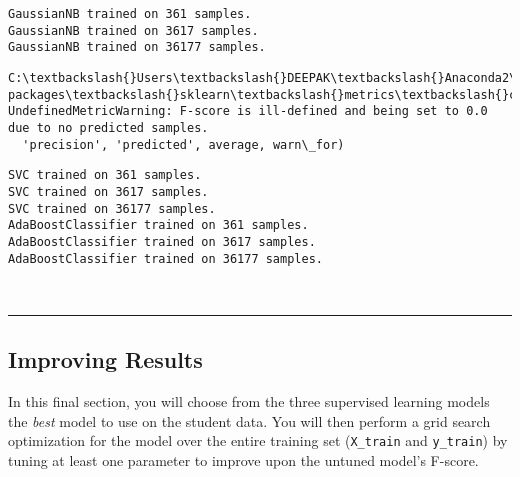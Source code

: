 \documentclass[11pt]{article}
\begin{document}
    \begin{Verbatim}[commandchars=\\\{\}]
GaussianNB trained on 361 samples.
GaussianNB trained on 3617 samples.
GaussianNB trained on 36177 samples.

    \end{Verbatim}

    \begin{Verbatim}[commandchars=\\\{\}]
C:\textbackslash{}Users\textbackslash{}DEEPAK\textbackslash{}Anaconda2\textbackslash{}lib\textbackslash{}site-packages\textbackslash{}sklearn\textbackslash{}metrics\textbackslash{}classification.py:1135: UndefinedMetricWarning: F-score is ill-defined and being set to 0.0 due to no predicted samples.
  'precision', 'predicted', average, warn\_for)

    \end{Verbatim}

    \begin{Verbatim}[commandchars=\\\{\}]
SVC trained on 361 samples.
SVC trained on 3617 samples.
SVC trained on 36177 samples.
AdaBoostClassifier trained on 361 samples.
AdaBoostClassifier trained on 3617 samples.
AdaBoostClassifier trained on 36177 samples.

    \end{Verbatim}

    \begin{center}
    \end{center}
    { \hspace*{\fill} \\}
    
    \begin{center}\rule{0.5\linewidth}{\linethickness}\end{center}

\subsection{Improving Results}\label{improving-results}

In this final section, you will choose from the three supervised
learning models the \emph{best} model to use on the student data. You
will then perform a grid search optimization for the model over the
entire training set (\texttt{X\_train} and \texttt{y\_train}) by tuning
at least one parameter to improve upon the untuned model's F-score.
\end{document}
